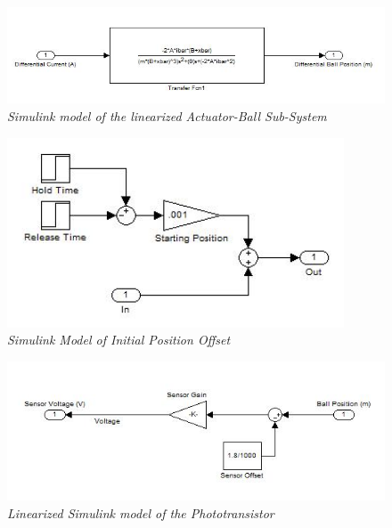 \documentclass{article}
\theoremstyle{plain}
\theoremstyle{definition}
\theoremstyle{remark}
\begin{document}
\begin{figure}
\begin{center}
\includegraphics[width = 15cm]{LinearUnControlledActuatorBall}
\caption{\emph{Simulink model of the linearized Actuator-Ball Sub-System}}
\label{Q1_e7}
\end{center}
\end{figure}

\begin{figure}
\begin{center}
\includegraphics[width = 10cm]{LinearUnControlledInitialization}
\caption{\emph{Simulink Model of Initial Position Offset}}
\label{Q1_e8}
\end{center}
\end{figure}


\begin{figure}
\begin{center}
\includegraphics[width = 15cm]{LinearUnControlledSensor}
\caption{\emph{Linearized Simulink model of the Phototransistor}}
\label{Q1_e9}
\end{center}
\end{figure}
\end{document}

